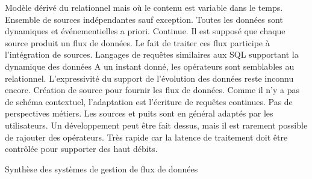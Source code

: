 \begin{table}[!ht]
\criteretabDonnee
    {Modèle dérivé du relationnel mais où le contenu est variable dans le temps.}
    {Ensemble de sources indépendantes sauf exception.}
    {Toutes les données sont dynamiques et événementielles a priori.}
\criteretabTraitement
    {Continue.}
    {Il est supposé que chaque source produit un flux de données. Le fait de traiter ces flux participe à l'intégration de sources.}
    {Langages de requêtes similaires aux SQL supportant la dynamique des données}
    {A un instant donné, les opérateurs sont semblables au relationnel. L'expressivité du support de l'évolution des données reste inconnu encore.}
\criteretabAdaptabilite
    {Création de source pour fournir les flux de données. Comme il n'y a pas de schéma contextuel, l'adaptation est l'écriture de requêtes continues.}
    {Pas de perspectives métiers.}
    {Les sources et puits sont en général adaptés par les utilisateurs. Un développement peut être fait dessus, mais il est rarement possible de rajouter des opérateurs.}
    {Très rapide car la latence de traitement doit être contrôlée pour supporter des haut débits.}
\caption{Synthèse des systèmes de gestion de flux de données}\label{tab:rw:supervision:sgfd:synthese}
\end{table}
